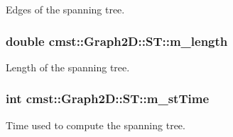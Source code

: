 Edges of the spanning tree. 

\subsubsection[{\texorpdfstring{m\+\_\+length}{m_length}}]{\setlength{\rightskip}{0pt plus 5cm}double cmst\+::\+Graph2\+D\+::\+S\+T\+::m\+\_\+length}\hypertarget{structcmst_1_1_graph2_d_1_1_s_t_a954af452de884ab5a96ef6a396b9d531}{}\label{structcmst_1_1_graph2_d_1_1_s_t_a954af452de884ab5a96ef6a396b9d531}


Length of the spanning tree. 

\subsubsection[{\texorpdfstring{m\+\_\+st\+Time}{m_stTime}}]{\setlength{\rightskip}{0pt plus 5cm}int cmst\+::\+Graph2\+D\+::\+S\+T\+::m\+\_\+st\+Time}\hypertarget{structcmst_1_1_graph2_d_1_1_s_t_ad3201db988690542cc7ef7ddff9525cc}{}\label{structcmst_1_1_graph2_d_1_1_s_t_ad3201db988690542cc7ef7ddff9525cc}


Time used to compute the spanning tree. 

